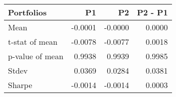 \begin{tabular}{lrrr}
\toprule
Portfolios & P1 & P2 & P2 - P1 \\
\midrule
Mean & -0.0001 & -0.0000 & 0.0000 \\
t-stat of mean & -0.0078 & -0.0077 & 0.0018 \\
p-value of mean & 0.9938 & 0.9939 & 0.9985 \\
Stdev & 0.0369 & 0.0284 & 0.0381 \\
Sharpe & -0.0014 & -0.0014 & 0.0003 \\
\bottomrule
\end{tabular}
